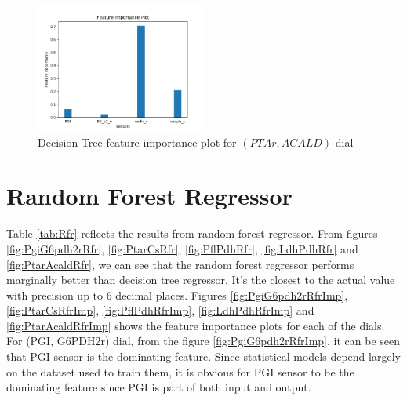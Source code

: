 \documentclass[12pt,chapterheads]{ucsd}
\begin{document}
\begin{figure}[h] 
\centering
\includegraphics[width=0.5\textwidth]{PTAr_ACALD_dtr_important_features}
\caption[Decision Tree feature importance plot for $(PTAr, ACALD)$ dial]
{Decision Tree feature importance plot for $(PTAr, ACALD)$ dial}
\label{fig:PtarAcaldDtrImp}
\end{figure}

\section{Random Forest Regressor}\label{sec:rfrRes}
Table \ref{tab:Rfr} reflects the results from random forest regressor.
From figures \ref{fig:PgiG6pdh2rRfr}, \ref{fig:PtarCsRfr}, \ref{fig:PflPdhRfr}, \ref{fig:LdhPdhRfr} and \ref{fig:PtarAcaldRfr}, we can see that the random forest regressor performs marginally better than decision tree regressor. It's the closest to the actual value with precision up to 6 decimal places.
Figures \ref{fig:PgiG6pdh2rRfrImp}, \ref{fig:PtarCsRfrImp}, \ref{fig:PflPdhRfrImp}, \ref{fig:LdhPdhRfrImp} and \ref{fig:PtarAcaldRfrImp} shows the feature importance plots for each of the dials.\\
For \string(PGI, G6PDH2r) dial, from the figure \ref{fig:PgiG6pdh2rRfrImp}, it can be seen that PGI sensor is the dominating feature. Since statistical models depend largely on the dataset used to train them, it is obvious for PGI sensor to be the dominating feature since PGI is part of both input and output.\\ 
\end{document}
